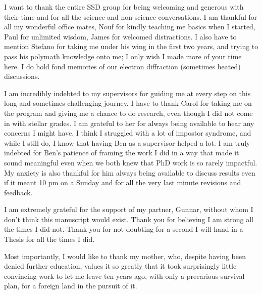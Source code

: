 \documentclass[
11pt, %
oneside, %
english, %
onehalfspacing, %
headsepline, %
chapterinoneline, %
]{MastersDoctoralThesis} %
\begin{document}
\begin{acknowledgements}

\vspace{2cm}
I want to thank the entire SSD group for being welcoming and generous with their time and for all the science and non-science conversations. I am thankful for all my wonderful office mates, Nouf for kindly teaching me basics when I started, Paul for unlimited wisdom, James for welcomed distractions. I also have to mention Stefano for taking me under his wing in the first two years, and trying to pass his polymath knowledge onto me; I only wish I made more of your time here. I do hold fond memories of our electron diffraction (sometimes heated) discussions.

I am incredibly indebted to my supervisors for guiding me at every step on this long and sometimes challenging journey. I have to thank Carol for taking me on the program and giving me a chance to do research, even though I did not come in with stellar grades. I am grateful to her for always being available to hear any concerns I might have. I think I struggled with a lot of impostor syndrome, and while I still do, I know that having Ben as a supervisor helped a lot. I am truly indebted for Ben's patience of framing the work I did in a way that made it sound meaningful even when we both knew that PhD work is so rarely impactful. My anxiety is also thankful for him always being available to discuss results even if it meant 10 pm on a Sunday and for all the very last minute revisions and feedback. 

I am extremely grateful for the support of my partner, Gunnar, without whom I don't think this manuscript would exist. Thank you for believing I am strong all the times I did not. Thank you for not doubting for a second I will hand in a Thesis for all the times I did.  


Most importantly, I would like to thank my mother, who, despite having been denied further education, values it so greatly that it took surprisingly little convincing work to let me leave ten years ago, with only a precarious survival plan, for a foreign land in the pursuit of it.   


\end{acknowledgements}
\end{document}
